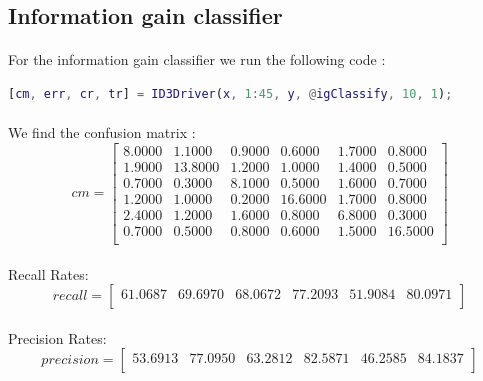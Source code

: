 \documentclass[a4paper,12pt,oneside,final]{report}
\begin{document}
\subsection{Information gain classifier}
\paragraph{}
For the information gain classifier we run the following code :
\newline
\begin{lstlisting}[language=MATLAB, frame=single]
[cm, err, cr, tr] = ID3Driver(x, 1:45, y, @igClassify, 10, 1);
\end{lstlisting}
\paragraph{}
We find the confusion matrix :
\[
cm = \left[\begin{array}{cccccc}
    8.0000  &  1.1000  &  0.9000  &  0.6000  &  1.7000  &  0.8000 \\
    1.9000  & 13.8000  &  1.2000  &  1.0000  &  1.4000  &  0.5000 \\
    0.7000  &  0.3000  &  8.1000  &  0.5000  &  1.6000  &  0.7000 \\
    1.2000  &  1.0000  &  0.2000  & 16.6000  &  1.7000  &  0.8000 \\
    2.4000  &  1.2000  &  1.6000  &  0.8000  &  6.8000  &  0.3000 \\
    0.7000  &  0.5000  &  0.8000  &  0.6000  &  1.5000  & 16.5000 \\

\end{array}
\right]
\]
\paragraph{}
Recall Rates:
\[
recall = \left[\begin{array}{cccccc}
61.0687 &  69.6970  & 68.0672 &  77.2093 &  51.9084  & 80.0971 \\
\end{array}
\right]
\]
\paragraph{}
Precision Rates:
\[
precision = \left[\begin{array}{cccccc}
 53.6913  & 77.0950 &  63.2812 &  82.5871  & 46.2585  & 84.1837 \\
\end{array}
\right]
\]
\end{document}
